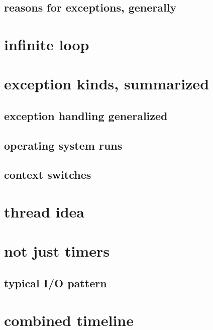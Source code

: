\subsection{reasons for exceptions, generally}


\section{infinite loop}


\section{exception kinds, summarized}


\subsection{exception handling generalized}


\subsection{operating system runs}


\subsection{context switches} 


\section{thread idea}


\section{not just timers}

\subsection{typical I/O pattern}




\section{combined timeline}


